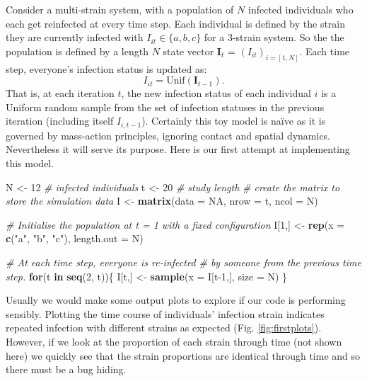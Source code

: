 \documentclass[10pt,letterpaper]{article}
\newenvironment{Shaded}{\begin{snugshade}}{\end{snugshade}}
\newcommand{\CommentTok}[1]{\textcolor[rgb]{0.56,0.35,0.01}{\textit{#1}}}
\newcommand{\ControlFlowTok}[1]{\textcolor[rgb]{0.13,0.29,0.53}{\textbf{#1}}}
\newcommand{\DataTypeTok}[1]{\textcolor[rgb]{0.13,0.29,0.53}{#1}}
\newcommand{\DecValTok}[1]{\textcolor[rgb]{0.00,0.00,0.81}{#1}}
\newcommand{\KeywordTok}[1]{\textcolor[rgb]{0.13,0.29,0.53}{\textbf{#1}}}
\newcommand{\NormalTok}[1]{#1}
\newcommand{\OtherTok}[1]{\textcolor[rgb]{0.56,0.35,0.01}{#1}}
\newcommand{\StringTok}[1]{\textcolor[rgb]{0.31,0.60,0.02}{#1}}
\begin{document}
Consider a multi-strain system, with a population of \(N\) infected individuals who each get reinfected at every time step.
Each individual is defined by the strain they are currently infected with \(I_{it} \in \{a, b, c\}\) for a 3-strain system. So the the population is defined by a length \(N\) state vector \(\mathbf{I}_t\) = \((I_{it})_{i=[1,N]}\).
Each time step, everyone's infection status is updated as:
\[I_{it} = \text{Unif}(\mathbf{I}_{t-1}).\]
That is, at each iteration \(t\), the new infection status of each individual \(i\) is a Uniform random sample from the set of infection statuses in the previous iteration (including itself \(I_{i,t-1}\)).
Certainly this toy model is naïve as it is governed by mass-action principles, ignoring contact and spatial dynamics.
Nevertheless it will serve its purpose.
Here is our first attempt at implementing this model.
\newline
{}\label{first_code}

\begin{Shaded}
\begin{Highlighting}[]
\NormalTok{N <-}\StringTok{ }\DecValTok{12} \CommentTok{# infected individuals}
\NormalTok{t <-}\StringTok{ }\DecValTok{20} \CommentTok{# study length}
\CommentTok{# create the matrix to store the simulation data}
\NormalTok{I <-}\StringTok{ }\KeywordTok{matrix}\NormalTok{(}\DataTypeTok{data =} \OtherTok{NA}\NormalTok{, }\DataTypeTok{nrow =}\NormalTok{ t, }\DataTypeTok{ncol =}\NormalTok{ N)}

\CommentTok{# Initialise the population at t = 1 with a fixed configuration}
\NormalTok{I[}\DecValTok{1}\NormalTok{,] <-}\StringTok{ }\KeywordTok{rep}\NormalTok{(}\DataTypeTok{x =} \KeywordTok{c}\NormalTok{(}\StringTok{"a"}\NormalTok{, }\StringTok{"b"}\NormalTok{, }\StringTok{"c"}\NormalTok{), }\DataTypeTok{length.out =}\NormalTok{ N)}

\CommentTok{# At each time step, everyone is re-infected }
\CommentTok{#   by someone from the previous time step.}
\ControlFlowTok{for}\NormalTok{(t }\ControlFlowTok{in} \KeywordTok{seq}\NormalTok{(}\DecValTok{2}\NormalTok{, t))\{}
\NormalTok{  I[t,] <-}\StringTok{ }\KeywordTok{sample}\NormalTok{(}\DataTypeTok{x =}\NormalTok{ I[t}\DecValTok{-1}\NormalTok{,], }\DataTypeTok{size =}\NormalTok{ N)}
\NormalTok{\}}
\end{Highlighting}
\end{Shaded}

Usually we would make some output plots to explore if our code is performing sensibly.
Plotting the time course of individuals' infection strain indicates repeated infection with different strains as expected (Fig. \ref{fig:firstplots}).
However, if we look at the proportion of each strain through time (not shown here) we quickly see that the strain proportions are identical through time and so there must be a bug hiding.
\end{document}
